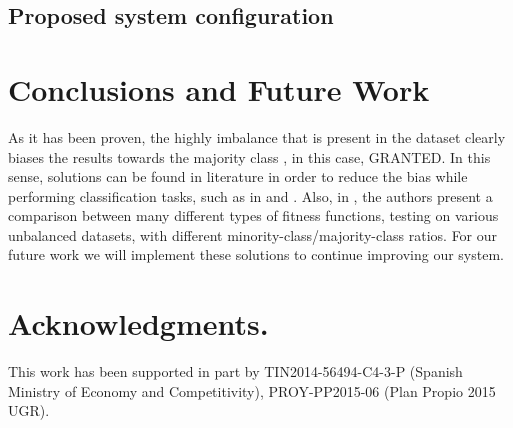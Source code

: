 \documentclass[a4paper,10pt,twocolumn,preprint,3p]{elsarticle}
\begin{document}
\subsection{Proposed system configuration}

%
%
%


\section{Conclusions and Future Work}
\label{sec:future}

As it has been proven, the highly imbalance that is present in the
dataset clearly biases the results towards the majority class
\cite{japkowicz2002class}, in this case, GRANTED. In this sense,
solutions can be found in literature in order to reduce the bias while
performing classification tasks, such as in \cite{chawla2005data} and
\cite{sun2009classification}. Also, in \cite{bhowan2012developing},
the authors present a comparison between many different types of
fitness functions, testing on various unbalanced datasets, with
different minority-class/majority-class ratios. For our future work we
will implement these solutions to continue improving our system. 

\section*{Acknowledgments.}

This work has been supported in part by TIN2014-56494-C4-3-P (Spanish
Ministry of Economy and Competitivity), PROY-PP2015-06 (Plan Propio
2015 UGR). %



\end{document}
